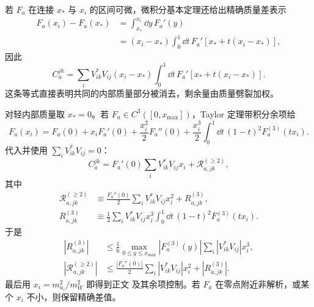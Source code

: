 \begin{derivation}
若 $F_a$ 在连接 $x_*$ 与 $x_i$ 的区间可微，微积分基本定理还给出精确质量差表示
\begin{align*}
 F_a(x_i)-F_a(x_*)
 &=\int_{x_*}^{x_i}\dd y\,F_a'(y)\\
 &=(x_i-x_*)\int_0^1\dd t\,
 F_a'\!\left[x_*+t(x_i-x_*)\right],
\end{align*}
因此
\begin{equation*}
 C_a^{jk}
 =\sum_iV_{ik}^*V_{ij}(x_i-x_*)
 \int_0^1\dd t\,
 F_a'\!\left[x_*+t(x_i-x_*)\right].
\end{equation*}
这条等式直接表明共同的内部质量部分被消去，剩余量由质量劈裂加权。

对轻内部质量取 $x_*=0$。若 $F_a\in C^3([0,x_{\max}])$，Taylor 定理带积分余项给
\begin{equation*}
 F_a(x_i)
 =F_a(0)+x_iF_a'(0)+\frac{x_i^2}{2}F_a''(0)
 +\frac{x_i^3}{2}\int_0^1\dd t\,(1-t)^2F_a^{(3)}(tx_i).
\end{equation*}
代入并使用 $\sum_iV_{ik}^*V_{ij}=0$：
\begin{equation*}
 C_a^{jk}
 =F_a'(0)\sum_iV_{ik}^*V_{ij}x_i
 +\mathcal R_{a,jk}^{(\ge2)},
\end{equation*}
其中
\begin{align*}
 \mathcal R_{a,jk}^{(\ge2)}
 &\equiv
 \frac{F_a''(0)}2
 \sum_iV_{ik}^*V_{ij}x_i^2+R_{a,jk}^{(3)},\\
 R_{a,jk}^{(3)}
 &\equiv
 \frac12\sum_iV_{ik}^*V_{ij}x_i^3
 \int_0^1\dd t\,(1-t)^2F_a^{(3)}(tx_i).
\end{align*}
于是
\begin{align*}
 |R_{a,jk}^{(3)}|
 &\le\frac16
 \max_{0\le y\le x_{\max}}|F_a^{(3)}(y)|
 \sum_i|V_{ik}^*V_{ij}|x_i^3,\\
 |\mathcal R_{a,jk}^{(\ge2)}|
 &\le\frac{|F_a''(0)|}{2}
 \sum_i|V_{ik}^*V_{ij}|x_i^2
 +|R_{a,jk}^{(3)}|.
\end{align*}
最后用 $x_i=m_{u_i}^2/m_W^2$ 即得到正文 及其余项控制。若 $F_a$ 在零点附近非解析，或某个 $x_i$ 不小，则保留精确差值。
\end{derivation}

